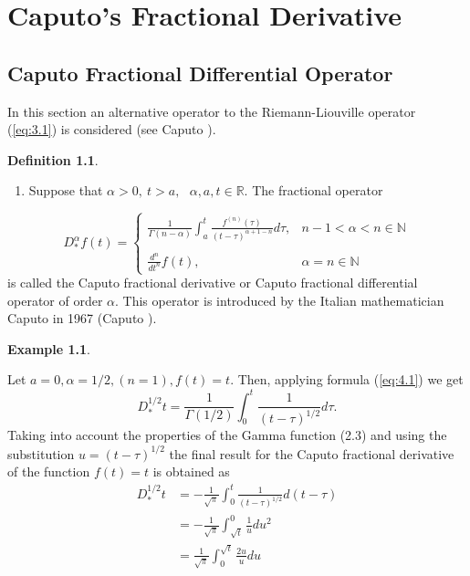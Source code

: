 \documentclass[a4paper,14pt,oneside]{book}
\theoremstyle{plain}
\theoremstyle{definition}
\newtheorem{defn}{Definition}[section]
\newtheorem{exmp}{Example}[section]%
\theoremstyle{remark}
\begin{document}
         \chapter{Caputo's Fractional Derivative}
\begin{center}
\begin{flushleft} 
\justify
\section{Caputo Fractional Differential Operator}
\Large{
In this section an alternative operator to the Riemann-Liouville operator (\ref{eq:3.1}) is considered (see Caputo \cite{bb13}).
\begin{defn}
\begin{enumerate}
\item Suppose that $\alpha>0,~ t>a, ~~~\alpha, a, t \in \mathbb{R}$. The fractional operator
\end{enumerate}
\begin{equation}\label{eq:4.1}
D_{*}^{\alpha} f(t)=\left\{\begin{array}{ll}
\frac{1}{\Gamma(n-\alpha)} \int_{a}^{t} \frac{f^{(n)}(\tau)}{(t-\tau)^{\alpha+1-n}} d \tau, & n-1<\alpha<n \in \mathbb{N} \\ \\
\frac{d^{n}}{d t^{n}} f(t), & \alpha=n \in \mathbb{N}
\end{array}\right.
\end{equation}
is called the Caputo fractional derivative or Caputo fractional differential operator of order $\alpha$. This operator is introduced by the Italian mathematician Caputo in 1967 (Caputo \cite{bb13}).
\end{defn}
\begin{exmp}
\end{exmp}
Let $a=0, \alpha=1 / 2,(n=1), f(t)=t$. Then, applying formula (\ref{eq:4.1}) we get
$$
D_{*}^{1 / 2} t=\frac{1}{\Gamma(1 / 2)} \int_{0}^{t} \frac{1}{(t-\tau)^{1 / 2}} d \tau .
$$
Taking into account the properties of the Gamma function (2.3) and using the substitution $u=(t-\tau)^{1 / 2}$ the final result for the Caputo fractional derivative of the function $f(t)=t$ is obtained as
$$
\begin{aligned}
D_{*}^{1 / 2} t &=-\frac{1}{\sqrt{\pi}} \int_{0}^{t} \frac{1}{(t-\tau)^{1 / 2}} d(t-\tau)\\
&=-\frac{1}{\sqrt{\pi}} \int_{\sqrt{t}}^{0} \frac{1}{u} d u^{2} \\
&=\frac{1}{\sqrt{\pi}} \int_{0}^{\sqrt{t}} \frac{2 u}{u} d u \\

\end{aligned}$$}
\end{flushleft}
\end{center}
\end{document}

